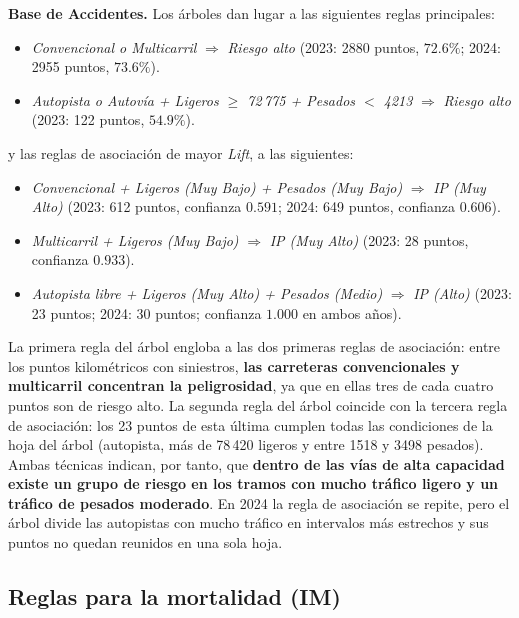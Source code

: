 \documentclass[twoside,a4paper,12pt,onecolumn,openany]{book}
\begin{document}
\textbf{Base de Accidentes.} Los árboles dan lugar a las siguientes reglas principales:
 
\begin{itemize}
    \item \textit{Convencional o Multicarril} $\Rightarrow$ \textit{Riesgo alto} (2023: 2880 puntos, $72.6\%$; 2024: 2955 puntos, $73.6\%$).
    \item \textit{Autopista o Autovía + Ligeros $\geq$ 72\,775 + Pesados $<$ 4213} $\Rightarrow$ \textit{Riesgo alto} (2023: 122 puntos, $54.9\%$).
\end{itemize}
 
y las reglas de asociación de mayor \textit{Lift}, a las siguientes:
 
\begin{itemize}
    \item \textit{Convencional + Ligeros (Muy Bajo) + Pesados (Muy Bajo)} $\Rightarrow$ \textit{IP (Muy Alto)} (2023: 612 puntos, confianza $0.591$; 2024: 649 puntos, confianza $0.606$).
    \item \textit{Multicarril + Ligeros (Muy Bajo)} $\Rightarrow$ \textit{IP (Muy Alto)} (2023: 28 puntos, confianza $0.933$).
    \item \textit{Autopista libre + Ligeros (Muy Alto) + Pesados (Medio)} $\Rightarrow$ \textit{IP (Alto)} (2023: 23 puntos; 2024: 30 puntos; confianza $1.000$ en ambos años).
\end{itemize}
 
La primera regla del árbol engloba a las dos primeras reglas de asociación: entre los puntos kilométricos con siniestros, \textbf{las carreteras convencionales y multicarril concentran la peligrosidad}, ya que en ellas tres de cada cuatro puntos son de riesgo alto. La segunda regla del árbol coincide con la tercera regla de asociación: los 23 puntos de esta última cumplen todas las condiciones de la hoja del árbol (autopista, más de 78\,420 ligeros y entre 1518 y 3498 pesados). Ambas técnicas indican, por tanto, que \textbf{dentro de las vías de alta capacidad existe un grupo de riesgo en los tramos con mucho tráfico ligero y un tráfico de pesados moderado}. En 2024 la regla de asociación se repite, pero el árbol divide las autopistas con mucho tráfico en intervalos más estrechos y sus puntos no quedan reunidos en una sola hoja.
 
\subsection{Reglas para la mortalidad (IM)}
 
\end{document}
